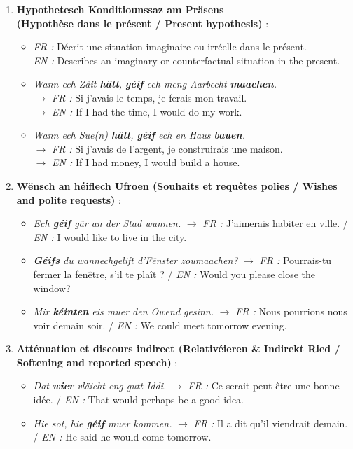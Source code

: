 \begin{enumerate}
    \item \textbf{Hypothetesch Konditiounssaz am Präsens} \\
    \textbf{(Hypothèse dans le présent / Present hypothesis)} :
    \begin{itemize}
        \item \textit{FR :} Décrit une situation imaginaire ou irréelle dans le présent. \\
        \textit{EN :} Describes an imaginary or counterfactual situation in the present.
        \item \textit{Wann ech Zäit \textbf{hätt}, \textbf{géif} ech meng Aarbecht \textbf{maachen}.} \\
        $\rightarrow$ \textit{FR :} Si j'avais le temps, je ferais mon travail. \\
        $\rightarrow$ \textit{EN :} If I had the time, I would do my work.
        \item \textit{Wann ech Sue(n) \textbf{hätt}, \textbf{géif} ech en Haus \textbf{bauen}.} \\
        $\rightarrow$ \textit{FR :} Si j'avais de l'argent, je construirais une maison. \\
        $\rightarrow$ \textit{EN :} If I had money, I would build a house.
    \end{itemize}

    \item \textbf{Wënsch an héiflech Ufroen (Souhaits et requêtes polies / Wishes and polite requests)} :
    \begin{itemize}
        \item \textit{Ech \textbf{géif} gär an der Stad wunnen.} $\rightarrow$ \textit{FR :} J'aimerais habiter en ville. / \textit{EN :} I would like to live in the city.
        \item \textit{\textbf{Géifs} du wannechgelift d'Fënster zoumaachen?} $\rightarrow$ \textit{FR :} Pourrais-tu fermer la fenêtre, s'il te plaît ? / \textit{EN :} Would you please close the window?
        \item \textit{Mir \textbf{kéinten} eis muer den Owend gesinn.} $\rightarrow$ \textit{FR :} Nous pourrions nous voir demain soir. / \textit{EN :} We could meet tomorrow evening.
    \end{itemize}

    \item \textbf{Atténuation et discours indirect (Relativéieren \& Indirekt Ried / Softening and reported speech)} :
    \begin{itemize}
        \item \textit{Dat \textbf{wier} vläicht eng gutt Iddi.} $\rightarrow$ \textit{FR :} Ce serait peut-être une bonne idée. / \textit{EN :} That would perhaps be a good idea.
        \item \textit{Hie sot, hie \textbf{géif} muer kommen.} $\rightarrow$ \textit{FR :} Il a dit qu'il viendrait demain. / \textit{EN :} He said he would come tomorrow.
    \end{itemize}
\end{enumerate}

